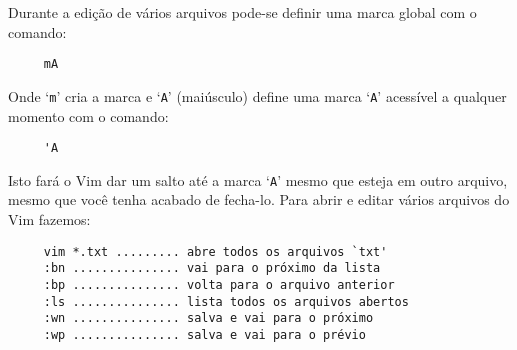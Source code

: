 Durante a edição de vários arquivos pode-se definir uma marca global com o
comando:

\begin{verbatim}
     mA
\end{verbatim}

Onde `{\tt m}' cria a marca e `{\tt A}' (maiúsculo) define uma marca `{\tt A}'
acessível a qualquer momento com o comando:

\begin{verbatim}
     'A
\end{verbatim}

Isto fará o Vim dar um salto até a marca `{\tt A}' mesmo que esteja em outro arquivo,
mesmo que você tenha acabado de fecha-lo. Para abrir e editar vários arquivos
do Vim fazemos:

\begin{verbatim}
     vim *.txt ......... abre todos os arquivos `txt'
     :bn ............... vai para o próximo da lista
     :bp ............... volta para o arquivo anterior
     :ls ............... lista todos os arquivos abertos
     :wn ............... salva e vai para o próximo
     :wp ............... salva e vai para o prévio
\end{verbatim}

% 
% 
% 
% 

